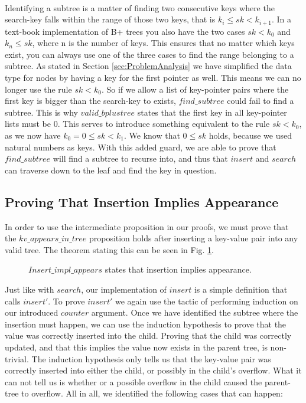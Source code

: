 \paragraph{}
Identifying a subtree is a matter of finding two consecutive keys where the search-key falls within the range of those two keys, that is $k_i \le sk < k_{i+1}$. In a text-book implementation of B+ trees you also have the two cases $sk < k_0$ and $k_{n} \le sk$, where n is the number of keys. This ensures that no matter which keys exist, you can always use one of the three cases to find the range belonging to a subtree. As stated in Section \ref{sec:ProblemAnalysis} we have simplified the data type for nodes by having a key for the first pointer as well. This means we can no longer use the rule $sk < k_0$. So if we allow a list of key-pointer pairs where the first key is bigger than the search-key to exists, $find\_subtree$ could fail to find a subtree. This is why $valid\_bplustree$ states that the first key in all key-pointer lists must be 0. This serves to introduce something equivalent to the rule $sk < k_0$, as we now have $k_0 = 0 \le sk < k_1$. We know that $0 \le sk$ holds, because we used natural numbers as keys. With this added guard, we are able to prove that $find\_subtree$ will find a subtree to recurse into, and thus that $insert$ and $search$ can traverse down to the leaf and find the key in question.

\subsection{Proving That Insertion Implies Appearance}
\label{sec:proving_insert_appears}
In order to use the intermediate proposition in our proofs, we must prove that the $kv\_appears\_in\_tree$ proposition holds after inserting a key-value pair into any valid tree. The theorem stating this can be seen in Fig. \ref{fig:insert_impl_appears}.

\begin{figure}
  
  \caption{$Insert\_impl\_appears$ states that insertion implies appearance.}
  \label{fig:insert_impl_appears}
\end{figure}

Just like with $search$, our implementation of $insert$ is a simple definition that calls $insert'$. To prove $insert'$ we again use the tactic of performing induction on our introduced $counter$ argument. Once we have identified the subtree where the insertion must happen, we can use the induction hypothesis to prove that the value was correctly inserted into the child. Proving that the child was correctly updated, and that this implies the value now exists in the parent tree, is non-trivial. The induction hypothesis only tells us that the key-value pair was correctly inserted into either the child, or possibly in the child's overflow. What it can not tell us is whether or a possible overflow in the child caused the parent-tree to overflow. All in all, we identified the following cases that can happen:

